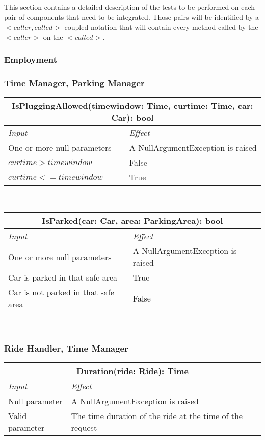 	
	This section contains a detailed description of the tests to be performed on each pair of components that need to be integrated. Those pairs will be identified by a $< caller, called >$ coupled notation that will contain every method called by the $< caller >$ on the $< called >$. 

	

	\subsubsection{Employment}
			
		\subsubsection*{Time Manager, Parking Manager}
		
			\begin{tabular}{ |l|l| }
				\hline
				\multicolumn{2}{|c|}{IsPluggingAllowed(timewindow: Time, curtime: Time, car: Car): bool}\\
				\hline
				\textit{Input} & \textit{Effect}\\ \hline
				One or more null parameters & A NullArgumentException is raised\\ \hline
				$curtime > timewindow$ & False\\ \hline
				$curtime <= timewindow$ & True\\ \hline
			\end{tabular}
			\\
			\begin{tabular}{ |l|l| }
				\hline
				\multicolumn{2}{|c|}{IsParked(car: Car, area: ParkingArea): bool}\\
				\hline
				\textit{Input} & \textit{Effect}\\ \hline
				One or more null parameters & A NullArgumentException is raised\\ \hline
				Car is parked in that safe area & True\\ \hline
				Car is not parked in that safe area & False\\ \hline
			\end{tabular}
			\\			
		
		
		
		\subsubsection*{Ride Handler, Time Manager}
			\begin{tabular}{ |l|l| }
				\hline
				\multicolumn{2}{|c|}{Duration(ride: Ride): Time}\\
				\hline
				\textit{Input} & \textit{Effect}\\ \hline
				Null parameter & A NullArgumentException is raised\\ \hline
				Valid parameter & The time duration of the ride at the time of the request\\ \hline
			\end{tabular}
			\\
		
